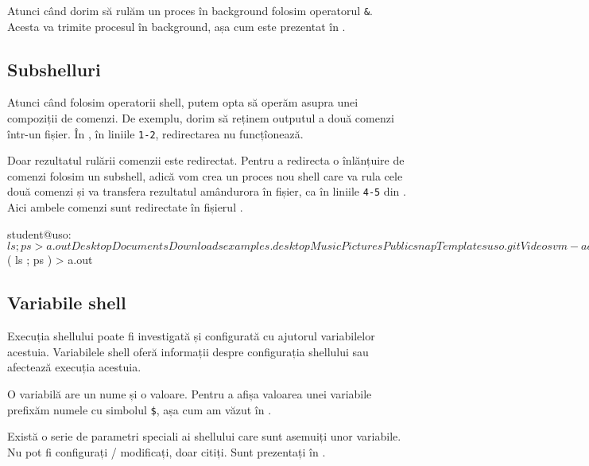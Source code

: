 Atunci când dorim să rulăm un proces în background folosim operatorul \texttt{\&}.
Acesta va trimite procesul în background, așa cum este prezentat în .

\subsection{Subshelluri}
\label{sec:cli:shell-func:subshell}

Atunci când folosim operatorii shell, putem opta să operăm asupra unei compoziții de comenzi.
De exemplu, dorim să reținem outputul a două comenzi într-un fișier.
În , în liniile \texttt{1-2}, redirectarea nu funcțîonează.

Doar rezultatul rulării comenzii  este redirectat.
Pentru a redirecta o înlănțuire de comenzi folosim un subshell, adică vom crea un proces nou shell care va rula cele două comenzi și va transfera rezultatul amândurora în fișier, ca în liniile \texttt{4-5} din .
Aici ambele comenzi sunt redirectate în fișierul .

\begin{screen}[caption={Subshelluri și redirectare},label={lst:cli:subshell}]
student@uso:~$ ls ; ps > a.out
Desktop  Documents  Downloads  examples.desktop  Music  Pictures  Public  snap  Templates  uso.git  Videos  vm-actions-log.txt

student@uso:~$ ( ls ; ps ) > a.out
\end{screen}

\subsection{Variabile shell}
\label{sec:cli:shell-func:vars}

Execuția shellului poate fi investigată și configurată cu ajutorul variabilelor acestuia.
Variabilele shell oferă informații despre configurația shellului sau afectează execuția acestuia.

O variabilă are un nume și o valoare.
Pentru a afișa valoarea unei variabile prefixăm numele cu simbolul \texttt{\$}, așa cum am văzut în .

Există o serie de parametri speciali ai shellului care sunt asemuiți unor variabile.
Nu pot fi configurați / modificați, doar citiți.
Sunt prezentați în .

